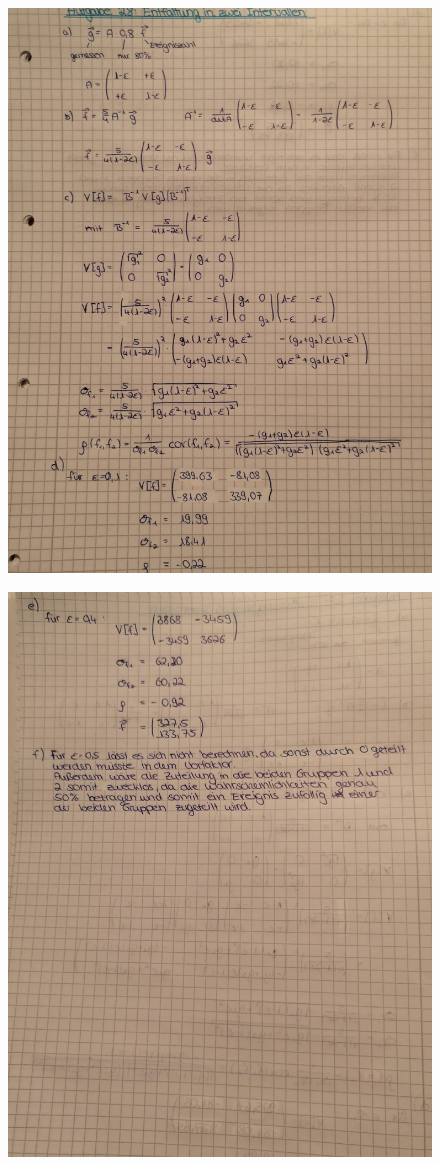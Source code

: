 \begin{figure}[H]
  \centering
  \includegraphics[width=\textwidth]{Aufgabe28/Aufgabe28_Teil1.jpeg}
\end{figure}

\begin{figure}[H]
  \centering
  \includegraphics[width=\textwidth]{Aufgabe28/Aufgabe28_Teil2.jpeg}
\end{figure}
